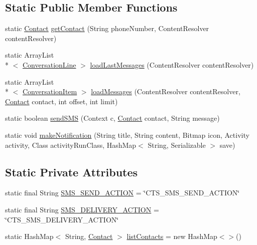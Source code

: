 \subsection*{Static Public Member Functions}
\begin{DoxyCompactItemize}
\item 
static \hyperlink{a00005}{Contact} \hyperlink{a00006_afb0bfb28009ccdfda1b58f26832b994f}{get\+Contact} (String phone\+Number, Content\+Resolver content\+Resolver)
\item 
static Array\+List\\*
$<$ \hyperlink{a00009}{Conversation\+Line} $>$ \hyperlink{a00006_aa92a9bca692459dbb3a2d61cf94ff242}{load\+Last\+Messages} (Content\+Resolver content\+Resolver)
\item 
static Array\+List\\*
$<$ \hyperlink{a00008}{Conversation\+Item} $>$ \hyperlink{a00006_a303cdc823347525806aa99487bb6074d}{load\+Messages} (Content\+Resolver content\+Resolver, \hyperlink{a00005}{Contact} contact, int offset, int limit)
\item 
static boolean \hyperlink{a00006_a6ad490642a293b184b343fc78f942af3}{send\+S\+M\+S} (Context c, \hyperlink{a00005}{Contact} contact, String message)
\item 
static void \hyperlink{a00006_a5e0bf80dacc45ede0c5519a88414f918}{make\+Notification} (String title, String content, Bitmap icon, Activity activity, Class activity\+Run\+Class, Hash\+Map$<$ String, Serializable $>$ save)
\end{DoxyCompactItemize}
\subsection*{Static Private Attributes}
\begin{DoxyCompactItemize}
\item 
static final String \hyperlink{a00006_ae783da46195d548123aa679a2040c53d}{S\+M\+S\+\_\+\+S\+E\+N\+D\+\_\+\+A\+C\+T\+I\+O\+N} = \char`\"{}C\+T\+S\+\_\+\+S\+M\+S\+\_\+\+S\+E\+N\+D\+\_\+\+A\+C\+T\+I\+O\+N\char`\"{}
\item 
static final String \hyperlink{a00006_a134bdf0d10a1ebe6bc019d986853ca23}{S\+M\+S\+\_\+\+D\+E\+L\+I\+V\+E\+R\+Y\+\_\+\+A\+C\+T\+I\+O\+N} = \char`\"{}C\+T\+S\+\_\+\+S\+M\+S\+\_\+\+D\+E\+L\+I\+V\+E\+R\+Y\+\_\+\+A\+C\+T\+I\+O\+N\char`\"{}
\item 
static Hash\+Map$<$ String, \hyperlink{a00005}{Contact} $>$ \hyperlink{a00006_a42b678132ea8e78c62ce961e43078bca}{list\+Contacts} = new Hash\+Map$<$$>$()
\end{DoxyCompactItemize}


